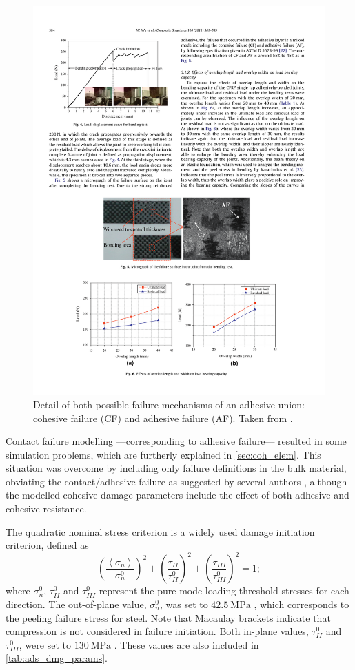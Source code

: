 \documentclass[cmfonts]{witpress}
\begin{document}
\begin{figure}
	\centering
	\includegraphics[width=0.7\linewidth]{figures/IMG_CUTRES/Wu_failure_systems}
	\caption[Detail of both possible failure mechanisms of an adhesive union: cohesive failure and adhesive failure.]{Detail of both possible failure mechanisms of an adhesive union: cohesive failure (CF) and adhesive failure (AF). Taken from \cite{Wu2013}.}
	\label{fig:Wu_failure_systems}
\end{figure}

Contact failure modelling ---corresponding to adhesive failure--- resulted in some simulation problems, which are furtherly explained in \cref{sec:coh_elem}. This situation was overcome by including only failure definitions in the bulk material, obviating the contact/adhesive failure as suggested by several authors \cite{Greve2007, Loureiro2010, Sadowski2010, Sadowski2011, Scattina2011, Sadowski2014, SernaMoreno2015}, although the modelled cohesive damage parameters include the effect of both adhesive and cohesive resistance.

The quadratic nominal stress criterion is a widely used damage initiation criterion, defined as
\begin{equation}
\left(\frac{\left<\sigma_{n}\right>}{\sigma_{n}^{0}}\right)^{2} + \left(\frac{\tau_{II}}{\tau_{II}^{0}}\right)^{2} + \left(\frac{\tau_{III}}{\tau_{III}^{0}}\right)^{2} = 1 ;
\label{eq:quads}
\end{equation}
where $\sigma_{n}^{0}$, $\tau_{II}^{0}$ and $\tau_{III}^{0}$ represent the pure mode loading threshold stresses for each direction. The out-of-plane value, $\sigma_{n}^{0}$, was set to $\SI{42.5}{\MPa}$ \cite{Scattina2011}, which corresponds to the peeling failure stress for steel. Note that Macaulay brackets indicate that compression is not considered in failure initiation. Both in-plane values, $\tau_{II}^{0}$ and $\tau_{III}^{0}$, were set to $\SI{130}{\MPa}$ \cite{Scattina2011}. These values are also included in \cref{tab:ads_dmg_params}. %
\end{document}
